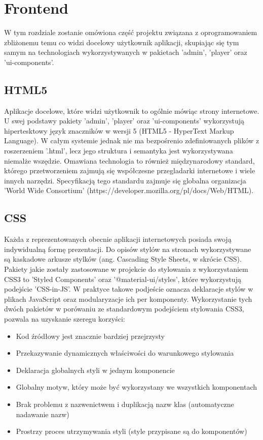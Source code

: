 \chapter{Frontend}
\label{ch:funplenop}
W tym rozdziale zostanie omówiona część projektu związana z oprogramowaniem zbliżonemu temu co widzi docelowy użytkownik aplikacji, skupiając się tym samym na technologiach wykorzystywanych w pakietach 'admin', 'player' oraz 'ui-components'.

\section{HTML5}
Aplikacje docelowe, które widzi użytkownik to ogólnie mówiąc strony internetowe. U swej podstawy pakiety 'admin', 'player' oraz 'ui-components' wykorzystują hipertesktowy język znaczników w wersji 5 (HTML5 - HyperText Markup Language). W całym systemie jednak nie ma bezpośrenio zdefiniowanych plików z roszerzeniem '.html', lecz jego struktura i semantyka jest wykorzystywana niemalże wszędzie. Omawiana technologia to również międzynarodowy standard, którego przetworzeniem zajmują się współczesne przegladarki internetowe i wiele innych narzędzi. Specyfikacją tego standardu zajmuje się globalna organizacja 'World Wide Consortium' (https://developer.mozilla.org/pl/docs/Web/HTML).

\section{CSS}
Każda z reprezentowanych obecnie aplikacji internetowych posiada swoją indywidualną formę prezentacji. Do opisów stylów na stronach wykorzystywane są kaskadowe arkusze stylków (ang. Cascading Style Sheets, w skrócie CSS). Pakiety jakie zostały zastosowane w projekcie do stylowania z wykorzystaniem CSS3 to 'Styled Components' oraz '@material-ui/styles', które wykorzystują podejście 'CSS-in-JS'. W praktyce takowe podjeście oznacza deklaracje stylów w plikach JavaScript oraz modularyzacje ich per komponenty. Wykorzystanie tych dwóch pakietów w porówaniu ze standardowym podejściem stylowania CSS3, pozwala na uzyskanie szeregu korzyści:

\begin{itemize}
    \item Kod źródłowy jest znacznie bardziej przejrzysty
    \item Przekazywanie dynamicznych właściwości do warunkowego stylowania
    \item Deklaracja globalnych styli w jednym komponencie
    \item Globalny motyw, który może być wykorzystany we wszystkich komponentach
    \item Brak problemu z nazwenictwem i duplikacją nazw klas (automatyczne nadawanie nazw)
    \item Prostrzy proces utrzymywania styli (style przypisane są do komponentów)
\end{itemize}


